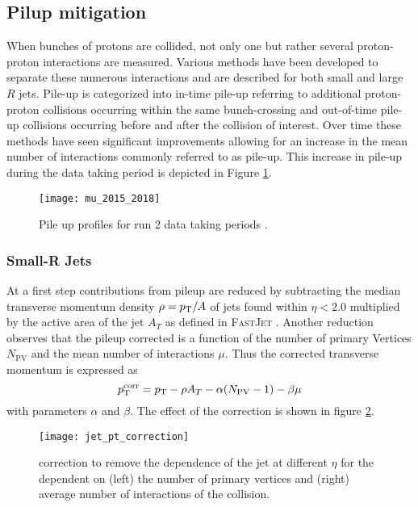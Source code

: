 \subsection{Pilup mitigation}
When bunches of protons are collided, not only one but rather several proton-proton interactions are measured. Various methods have been developed to separate these numerous interactions and are described for both small and large $R$ jets. Pile-up is categorized into in-time pile-up referring to additional proton-proton collisions occurring within the same bunch-crossing and out-of-time pile-up collisions occurring before and after the collision of interest. Over time these methods have seen significant improvements allowing for an increase in the mean number of interactions commonly referred to as pile-up. This increase in pile-up during the data taking period is depicted in Figure \ref{fig:pileup}.
\begin{figure}
  \centering
  \texttt{[image: mu\_2015\_2018]}
  \caption[]{Pile up profiles for run 2 data taking periods \citep{pileup}.}
  \label{fig:pileup}
\end{figure}


\subsubsection{Small-R Jets}
At a first step contributions from pileup are reduced by subtracting the median transverse momentum density $\rho=p_{\text{T}} / A$ of jets found within $\eta<2.0$ multiplied by the active area of the jet $A_T$ as defined in \textsc{FastJet} \citep{cacciari2012fastjet}. Another reduction observes that the pileup corrected \pt is a function of the number of primary Vertices $N_\text{PV}$ and the mean number of interactions $\mu$. Thus the corrected transverse momentum is expressed as 
\begin{equation}
  p_{\text{T}}^\text{corr}=p_{\text{T}}-\rho A_T -\alpha(N_\text{PV}-1)-\beta\mu
\end{equation}
with parameters $\alpha$ and $\beta$. The effect of the correction is shown in figure \ref{fig:jet_pt_correction}.
\begin{figure}
  \centering
  \texttt{[image: jet\_pt\_correction]}
  \caption[]{\pt correction to remove the \pt dependence of the jet at different $\eta$ for the \pt dependent on (left) the number of primary vertices and (right) average number of interactions of the collision.}
  \label{fig:jet_pt_correction}
\end{figure}

